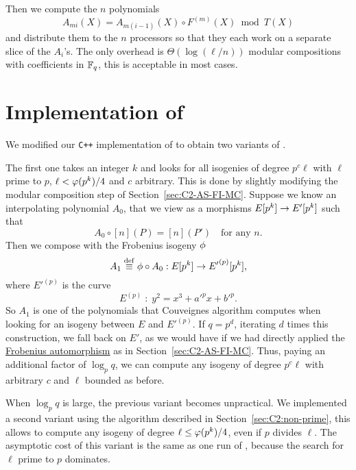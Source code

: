 Then we compute the $n$ polynomials
\begin{equation*}
  A_{mi}(X) = A_{m(i-1)}(X) \circ F^{(m)}(X) \bmod T(X)
\end{equation*}
and distribute them to the $n$ processors so that they each work on a
separate slice of the $A_i$'s. The only overhead is $\Theta(\log
(\ell/n))$ modular compositions with coefficients in $\mathbb{F}_q$, this is
acceptable in most cases.

\section{Implementation of \texorpdfstring{\ctwoud{}}{C2-UD}}
\label{sec:implementation-c2-ud}
We modified our \texttt{C++} implementation of \ctwoasfimc{} to obtain
two variants of \ctwoud{}.

The first one takes an integer $k$ and looks for all isogenies of
degree $p^c\ell$ with $\ell$ prime to $p$, $\ell<\varphi(p^k)/4$
and $c$ arbitrary. This is done by slightly modifying the modular
composition step of Section~\ref{sec:C2-AS-FI-MC}. Suppose we know an
interpolating polynomial $A_0$, that we view as a morphisms $E[p^k]\rightarrow
E'[p^k]$ such that
\begin{equation}
  \label{eq:184}
  A_0\circ[n](P) = [n](P')
  \quad\text{for any $n$.}
\end{equation}
Then we compose with the Frobenius isogeny $\phi$
\begin{equation}
  \label{eq:185}
  A_1 \overset{\mathrm{def}}{\equiv} \phi\circ A_0:E[p^k]\rightarrow {E'}^{(p)}[p^k]
  \text{,}
\end{equation}
where ${E'}^{(p)}$ is the curve
\begin{equation}
  \label{eq:186}
  E^{(p)}\;:\; y^2 = x^3+{a'}^px + {b}'^p
  \text{.}
\end{equation}
So $A_1$ is one of the polynomials that Couveignes algorithm computes
when looking for an isogeny between $E$ and ${E'}^{(p)}$. If $q=p^d$,
iterating $d$ times this construction, we fall back on $E'$, as we
would have if we had directly applied the
\hyperref[sec:curves-over-finite]{Frobenius automorphism} as in
Section~\ref{sec:C2-AS-FI-MC}. Thus, paying an additional factor of
$\log_p q$, we can compute any isogeny of degree $p^c\ell$ with
arbitrary $c$ and $\ell$ bounded as before.

When $\log_pq$ is large, the previous variant becomes unpractical. We
implemented a second variant using the algorithm described in
Section~\ref{sec:C2:non-prime}, this allows to compute any isogeny of
degree $\ell\le\varphi(p^k)/4$, even if $p$ divides $\ell$. The
asymptotic cost of this variant is the same as one run of \ctwoasfimc{},
because the search for $\ell$ prime to $p$ dominates.



